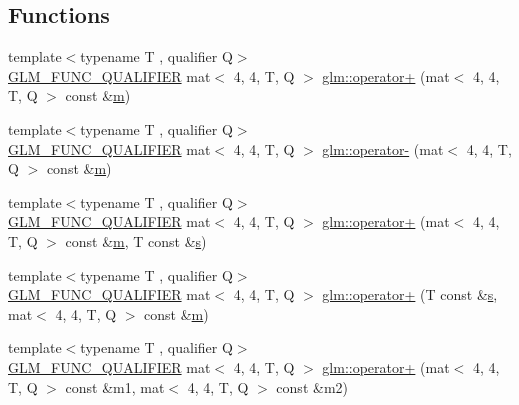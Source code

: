 \subsection*{Functions}
\begin{DoxyCompactItemize}
\item 
{\footnotesize template$<$typename T , qualifier Q$>$ }\\\mbox{\hyperlink{setup_8hpp_a33fdea6f91c5f834105f7415e2a64407}{G\+L\+M\+\_\+\+F\+U\+N\+C\+\_\+\+Q\+U\+A\+L\+I\+F\+I\+ER}} mat$<$ 4, 4, T, Q $>$ \mbox{\hyperlink{namespaceglm_a03db222d057436a66bdb95bba575ba6b}{glm\+::operator+}} (mat$<$ 4, 4, T, Q $>$ const \&\mbox{\hyperlink{_s_d_l__opengl__glext_8h_af593500c283bf1a787a6f947f503a5c2}{m}})
\item 
{\footnotesize template$<$typename T , qualifier Q$>$ }\\\mbox{\hyperlink{setup_8hpp_a33fdea6f91c5f834105f7415e2a64407}{G\+L\+M\+\_\+\+F\+U\+N\+C\+\_\+\+Q\+U\+A\+L\+I\+F\+I\+ER}} mat$<$ 4, 4, T, Q $>$ \mbox{\hyperlink{namespaceglm_a5bffee6489f103cf823c19f8e5b09e24}{glm\+::operator-\/}} (mat$<$ 4, 4, T, Q $>$ const \&\mbox{\hyperlink{_s_d_l__opengl__glext_8h_af593500c283bf1a787a6f947f503a5c2}{m}})
\item 
{\footnotesize template$<$typename T , qualifier Q$>$ }\\\mbox{\hyperlink{setup_8hpp_a33fdea6f91c5f834105f7415e2a64407}{G\+L\+M\+\_\+\+F\+U\+N\+C\+\_\+\+Q\+U\+A\+L\+I\+F\+I\+ER}} mat$<$ 4, 4, T, Q $>$ \mbox{\hyperlink{namespaceglm_ae26a037c7de3f3c22ded5612bc42efa2}{glm\+::operator+}} (mat$<$ 4, 4, T, Q $>$ const \&\mbox{\hyperlink{_s_d_l__opengl__glext_8h_af593500c283bf1a787a6f947f503a5c2}{m}}, T const \&\mbox{\hyperlink{_s_d_l__opengl_8h_a4af680a6c683f88ed67b76f207f2e6e4}{s}})
\item 
{\footnotesize template$<$typename T , qualifier Q$>$ }\\\mbox{\hyperlink{setup_8hpp_a33fdea6f91c5f834105f7415e2a64407}{G\+L\+M\+\_\+\+F\+U\+N\+C\+\_\+\+Q\+U\+A\+L\+I\+F\+I\+ER}} mat$<$ 4, 4, T, Q $>$ \mbox{\hyperlink{namespaceglm_aae71418fa4d956737bea9695abd62b7d}{glm\+::operator+}} (T const \&\mbox{\hyperlink{_s_d_l__opengl_8h_a4af680a6c683f88ed67b76f207f2e6e4}{s}}, mat$<$ 4, 4, T, Q $>$ const \&\mbox{\hyperlink{_s_d_l__opengl__glext_8h_af593500c283bf1a787a6f947f503a5c2}{m}})
\item 
{\footnotesize template$<$typename T , qualifier Q$>$ }\\\mbox{\hyperlink{setup_8hpp_a33fdea6f91c5f834105f7415e2a64407}{G\+L\+M\+\_\+\+F\+U\+N\+C\+\_\+\+Q\+U\+A\+L\+I\+F\+I\+ER}} mat$<$ 4, 4, T, Q $>$ \mbox{\hyperlink{namespaceglm_a7d22ecd127bca5161a879a9b60edc9d0}{glm\+::operator+}} (mat$<$ 4, 4, T, Q $>$ const \&m1, mat$<$ 4, 4, T, Q $>$ const \&m2)

\end{DoxyCompactItemize}
